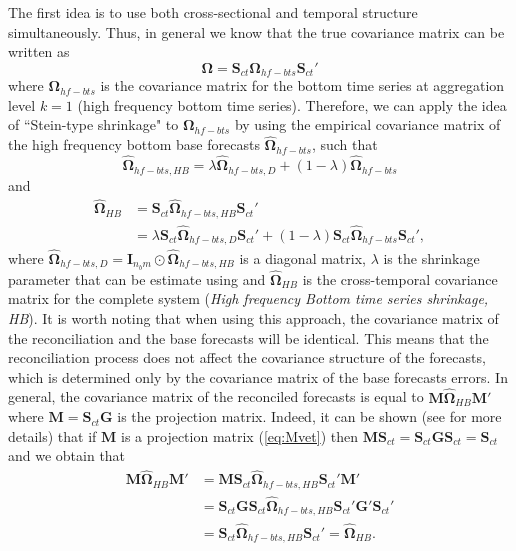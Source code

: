 \documentclass[a4paper,11pt]{article}
\newcommand{\Gvet}{\bm{G}}
\newcommand{\Ivet}{\bm{I}}
\newcommand{\Mvet}{\bm{M}}
\newcommand{\Svet}{\bm{S}}
\newcommand{\Omegavet}{\bm{\Omega}}
\theoremstyle{definition}
\begin{document}
The first idea is to use both cross-sectional and temporal structure simultaneously. Thus, in general we know that the true covariance matrix can be written as
\begin{equation}
	\label{eq:OmSct}
\Omegavet= \Svet_{ct}\Omegavet_{hf-bts}\Svet_{ct}'
\end{equation}
where $\Omegavet_{hf-bts}$ is the covariance matrix for the bottom time series at aggregation level $k = 1$ (high frequency bottom time series).
Therefore, we can apply the idea of “Stein-type shrinkage" to $\Omegavet_{hf-bts}$ by using the empirical covariance matrix of the high frequency bottom base forecasts $\widehat{\Omegavet}_{hf-bts}$, such that
$$
\widehat{\Omegavet}_{hf-bts, HB} = \lambda \widehat{\Omegavet}_{hf-bts, D} + (1-\lambda) \widehat{\Omegavet}_{hf-bts}
$$
and
\begin{align*}
	\widehat{\Omegavet}_{HB} & = \Svet_{ct}\widehat{\Omegavet}_{hf-bts, HB}\Svet_{ct}'\\
	& = \lambda \Svet_{ct}\widehat{\Omegavet}_{hf-bts, D}\Svet_{ct}'+ (1-\lambda) \Svet_{ct}\widehat{\Omegavet}_{hf-bts}\Svet_{ct}',
\end{align*}
where $\widehat{\Omegavet}_{hf-bts, D} = \Ivet_{n_b m}\odot\widehat{\Omegavet}_{hf-bts, HB}$ is a diagonal matrix, $\lambda$ is the shrinkage parameter that can be estimate using \cite{schafer2005} and $\widehat{\Omegavet}_{HB}$ is the cross-temporal covariance matrix for the complete system (\textit{High frequency Bottom time series shrinkage, HB}). 
It is worth noting that when using this approach, the covariance matrix of the reconciliation and the base forecasts will be identical. This means that the reconciliation process does not affect the covariance structure of the forecasts, which is determined only by the covariance matrix of the base forecasts errors. In general, the covariance matrix of the reconciled forecasts is equal to $\Mvet \widehat{\Omegavet}_{HB} \Mvet'$ where $\Mvet = \Svet_{ct}\Gvet$ is the projection matrix. Indeed, it can be shown (see \citealp{panagiotelis2021} for more details) that if $\Mvet$ is a projection matrix (\ref{eq:Mvet}) then $\Mvet\Svet_{ct} = \Svet_{ct}\Gvet\Svet_{ct} = \Svet_{ct}$ and we obtain that
$$
\begin{aligned}
	\Mvet \widehat{\Omegavet}_{HB} \Mvet' & = \Mvet\Svet_{ct}\widehat{\Omegavet}_{hf-bts, HB}\Svet_{ct}'\Mvet' \\ 
	& = \Svet_{ct}\Gvet\Svet_{ct}\widehat{\Omegavet}_{hf-bts, HB}\Svet_{ct}'\Gvet'\Svet_{ct}' \\
	& = \Svet_{ct}\widehat{\Omegavet}_{hf-bts, HB}\Svet_{ct}' = \widehat{\Omegavet}_{HB}.
\end{aligned}
$$
\end{document}
